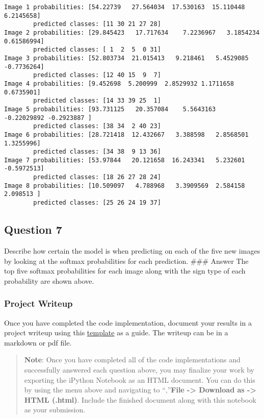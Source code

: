 \documentclass[11pt]{article}
\begin{document}
    \begin{Verbatim}[commandchars=\\\{\}]
Image 1 probabilities: [54.22739   27.564034  17.530163  15.110448   6.2145658]
        predicted classes: [11 30 21 27 28]
Image 2 probabilities: [29.845423   17.717634    7.2236967   3.1854234   0.61586994]
        predicted classes: [ 1  2  5  0 31]
Image 3 probabilities: [52.803734  21.015413   9.218461   5.4529085 -0.7736264]
        predicted classes: [12 40 15  9  7]
Image 4 probabilities: [9.452698  5.200999  2.8529932 1.1711658 0.6735901]
        predicted classes: [14 33 39 25  1]
Image 5 probabilities: [93.731125   20.357084    5.5643163  -0.22029892 -0.2923887 ]
        predicted classes: [38 34  2 40 23]
Image 6 probabilities: [28.721418  12.432667   3.388598   2.8568501  1.3255996]
        predicted classes: [34 38  9 13 36]
Image 7 probabilities: [53.97844   20.121658  16.243341   5.232601  -0.5972513]
        predicted classes: [18 26 27 28 24]
Image 8 probabilities: [10.509097   4.788968   3.3909569  2.584158   2.098513 ]
        predicted classes: [25 26 24 19 37]

    \end{Verbatim}

    \hypertarget{question-7}{%
\subsection{Question 7}\label{question-7}}

Describe how certain the model is when predicting on each of the five
new images by looking at the softmax probabilities for each prediction.
\#\#\# Answer The top five softmax probabilities for each image along
with the sign type of each probability are shown above.

    \hypertarget{project-writeup}{%
\subsubsection{Project Writeup}\label{project-writeup}}

Once you have completed the code implementation, document your results
in a project writeup using this
\href{https://github.com/udacity/CarND-Traffic-Sign-Classifier-Project/blob/master/writeup_template.md}{template}
as a guide. The writeup can be in a markdown or pdf file.

    \begin{quote}
\textbf{Note}: Once you have completed all of the code implementations
and successfully answered each question above, you may finalize your
work by exporting the iPython Notebook as an HTML document. You can do
this by using the menu above and navigating to \n``,''\textbf{File
-\textgreater{} Download as -\textgreater{} HTML (.html)}. Include the
finished document along with this notebook as your submission.
\end{quote}
\end{document}
